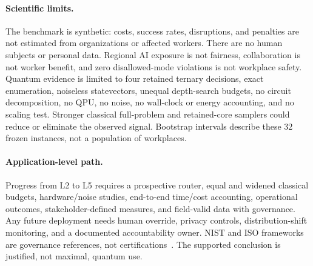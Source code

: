 \paragraph{Scientific limits.}
The benchmark is synthetic: costs, success rates, disruptions, and penalties are not estimated from organizations or affected workers. There are no human subjects or personal data. Regional AI exposure is not fairness, collaboration is not worker benefit, and zero disallowed-mode violations is not workplace safety. Quantum evidence is limited to four retained ternary decisions, exact enumeration, noiseless statevectors, unequal depth-search budgets, no circuit decomposition, no QPU, no noise, no wall-clock or energy accounting, and no scaling test. Stronger classical full-problem and retained-core samplers could reduce or eliminate the observed signal. Bootstrap intervals describe these 32 frozen instances, not a population of workplaces.

\paragraph{Application-level path.}
Progress from L2 to L5 requires a prospective router, equal and widened classical budgets, hardware/noise studies, end-to-end time/cost accounting, operational outcomes, stakeholder-defined measures, and field-valid data with governance. Any future deployment needs human override, privacy controls, distribution-shift monitoring, and a documented accountability owner. NIST and ISO frameworks are governance references, not certifications~\citep{nist2023airmf,iso42001,iso23894}. The supported conclusion is justified, not maximal, quantum use.
